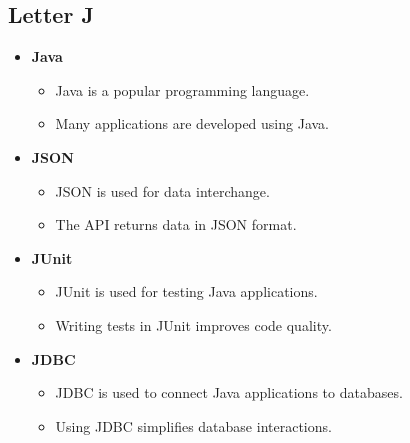 \subsection{Letter J}
\begin{itemize}
    \item \textbf{Java}
    \begin{itemize}
        \item Java is a popular programming language.
        \item Many applications are developed using Java.
    \end{itemize}
    \item \textbf{JSON}
    \begin{itemize}
        \item JSON is used for data interchange.
        \item The API returns data in JSON format.
    \end{itemize}
    \item \textbf{JUnit}
    \begin{itemize}
        \item JUnit is used for testing Java applications.
        \item Writing tests in JUnit improves code quality.
    \end{itemize}
    \item \textbf{JDBC}
    \begin{itemize}
        \item JDBC is used to connect Java applications to databases.
        \item Using JDBC simplifies database interactions.
    \end{itemize}
\end{itemize}

